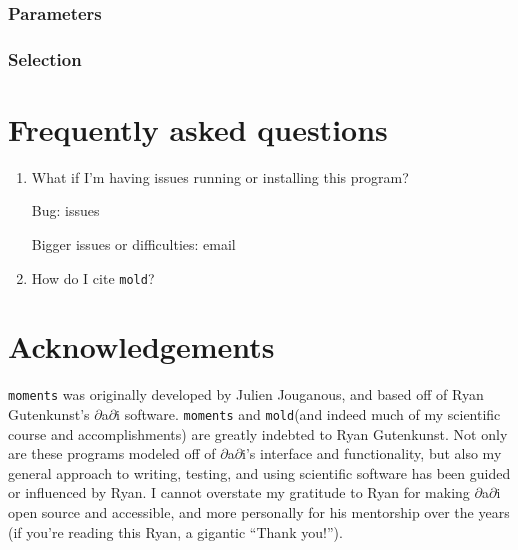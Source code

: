 \documentclass[10pt]{article}
\makeatletter
\newcommand{\dadi}{$\partial$a$\partial$i\xspace}
\newcommand{\mold}{\texttt{mold}\xspace}
\newcommand{\py}[1]{\lstinline[breaklines=true,language=Python, showstringspaces=False]@#1@}
\makeatother
\begin{document}
\subsubsection{Parameters}

\subsubsection{Selection}


\section{Frequently asked questions}

\begin{enumerate}

\item What if I'm having issues running or installing this program?

Bug: issues

Bigger issues or difficulties: email

\item How do I cite \mold?

\end{enumerate}



\section{Acknowledgements}
\py{moments} was originally developed by Julien Jouganous, and based off of Ryan Gutenkunst's \dadi software.
\py{moments} and \mold (and indeed much of my scientific course and accomplishments) are greatly indebted to Ryan Gutenkunst.
Not only are these programs modeled off of \dadi's interface and functionality, but also my general approach to writing, testing, and using scientific software has been guided or influenced by Ryan.
I cannot overstate my gratitude to Ryan for making \dadi open source and accessible, and more personally for his mentorship over the years (if you're reading this Ryan, a gigantic ``Thank you!'').





\end{document}

